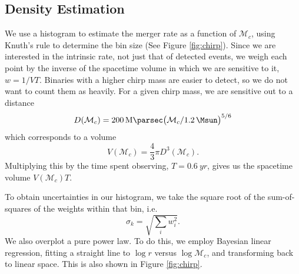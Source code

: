 \subsection{Density Estimation}
\label{sec:density}

We use a histogram to estimate the merger rate as a function of $\mathcal{M}_c$, using Knuth's rule to determine the bin size (See Figure \ref{fig:chirp}). Since we are interested in the intrinsic rate, not just that of detected events, we weigh each point by the inverse of the spacetime volume in which we are sensitive to it, $w = 1 / VT$. Binaries with a higher chirp mass are easier to detect, so we do not want to count them as heavily. For a given chirp mass, we are sensitive out to a distance
%
\begin{equation}
  D(\mathcal{M}_c) =
  \SI{200}{\mega\parsec} \qty( \mathcal{M}_c / \SI{1.2}{\Msun} )^{5/6}
\end{equation}
%
which corresponds to a volume
%
\begin{equation}
  V(\mathcal{M}_c) = \frac{4}{3} \pi D^3(\mathcal{M}_c).
\end{equation}
%
Multiplying this by the time spent observing, $T = \SI{0.6}{yr}$, gives us the spacetime volume $V(\mathcal{M}_c) T$.

To obtain uncertainties in our histogram, we take the square root of the sum-of-squares of the weights within that bin, i.e.
%
\begin{equation}
  \sigma_k = \sqrt{\sum_i w_i^2}.
\end{equation}
%
We also overplot a pure power law. To do this, we employ Bayesian linear regression, fitting a straight line to $\log r$ versus $\log \mathcal{M}_c$, and transforming back to linear space. This is also shown in Figure \ref{fig:chirp}.

